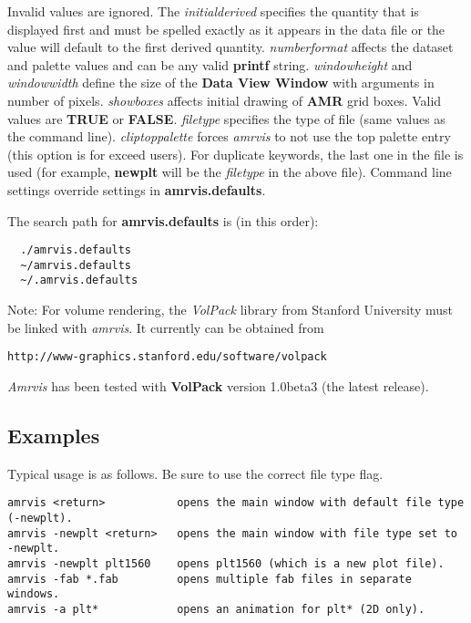 Invalid values are ignored.  The {\em initialderived} specifies the
quantity that is displayed first and must be spelled
exactly as it appears in the data file or the value will default to
the first derived quantity.  {\em numberformat} affects the dataset and
palette values and can be any valid {\bf printf} string.
{\em windowheight} and {\em windowwidth} define the size
of the {\bf Data View Window} with arguments in number of pixels.
{\em showboxes} affects initial drawing of {\bf AMR} grid boxes.  Valid
values are {\bf TRUE} or {\bf FALSE}.
{\em filetype} specifies the type of file (same values as the command line).
{\em cliptoppalette} forces {\em amrvis} to not use the top palette entry
(this option is for exceed users).
For duplicate keywords, the last one in the file is used (for example, {\bf newplt}
will be the {\em filetype} in the above file).  Command line settings
override settings in {\bf amrvis.defaults}.

The search path for {\bf amrvis.defaults} is (in this order):

\begin{verbatim}
  ./amrvis.defaults
  ~/amrvis.defaults
  ~/.amrvis.defaults
\end{verbatim}



Note:  For volume rendering, the {\em VolPack} library from Stanford University
must be linked with {\em amrvis}.  It currently can be obtained from

\begin{verbatim}
http://www-graphics.stanford.edu/software/volpack
\end{verbatim}

{\em Amrvis} has been tested with {\bf VolPack} version 1.0beta3 (the
latest release).


\subsection{Examples}

Typical usage is as follows.  Be sure to use the correct file type flag.

\begin{verbatim}
amrvis <return>           opens the main window with default file type (-newplt).
amrvis -newplt <return>   opens the main window with file type set to -newplt.
amrvis -newplt plt1560    opens plt1560 (which is a new plot file).
amrvis -fab *.fab         opens multiple fab files in separate windows.
amrvis -a plt*            opens an animation for plt* (2D only).
\end{verbatim}



